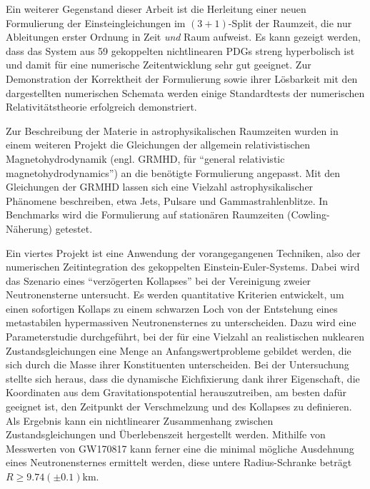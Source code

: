 \documentclass[a4paper,12pt]{article}
\begin{document}
Ein weiterer Gegenstand dieser Arbeit ist die Herleitung einer
neuen Formulierung der Einsteingleichungen im $(3+1)$-Split der Raumzeit, die 
nur Ableitungen erster Ordnung in Zeit \emph{und} Raum aufweist. Es kann
gezeigt werden, dass das System aus 59 gekoppelten nichtlinearen PDGs streng
hyperbolisch ist und damit für eine numerische Zeitentwicklung sehr
gut geeignet. Zur Demonstration der Korrektheit der Formulierung sowie ihrer
Lösbarkeit mit den dargestellten numerischen Schemata werden einige
Standardtests der numerischen Relativitätstheorie erfolgreich demonstriert.

Zur Beschreibung der Materie in astrophysikalischen Raumzeiten wurden in einem
weiteren Projekt die Gleichungen der allgemein relativistischen 
Magnetohydrodynamik (engl. GRMHD, für ``general relativistic
magnetohydrodynamics'') an die benötigte
Formulierung angepasst. Mit den Gleichungen der GRMHD lassen sich eine Vielzahl
astrophysikalischer Phänomene beschreiben, etwa Jets, Pulsare und
Gammastrahlenblitze. In Benchmarks wird die Formulierung auf stationären
Raumzeiten (Cowling-Näherung) getestet.

Ein viertes Projekt ist eine Anwendung der vorangegangenen
Techniken, also der numerischen Zeitintegration des gekoppelten
Einstein-Euler-Systems. Dabei wird das Szenario eines
``verzögerten Kollapses'' bei der Vereinigung zweier Neutronensterne untersucht.
Es werden quantitative Kriterien entwickelt, um einen sofortigen Kollaps
zu einem schwarzen Loch von der Entstehung eines metastabilen hypermassiven
Neutronensternes zu unterscheiden.
Dazu wird eine Parameterstudie
durchgeführt, bei der für eine Vielzahl an realistischen nuklearen
Zustandsgleichungen eine Menge an Anfangswertprobleme gebildet werden, die sich
durch die Masse ihrer Konstituenten unterscheiden.
Bei der Untersuchung stellte sich heraus, dass die
dynamische Eichfixierung dank ihrer Eigenschaft, die Koordinaten aus dem
Gravitationspotential herauszutreiben, am besten dafür geeignet ist, den
Zeitpunkt der Verschmelzung und des Kollapses zu definieren. Als Ergebnis
kann ein nichtlinearer Zusammenhang zwischen Zustandsgleichungen und
Überlebenszeit hergestellt werden. Mithilfe von Messwerten von GW170817
kann ferner eine die minimal mögliche Ausdehnung eines Neutronensternes
ermittelt werden, diese untere Radius-Schranke beträgt $R \geq 9.74(\pm 0.1)$km.
\end{document}
